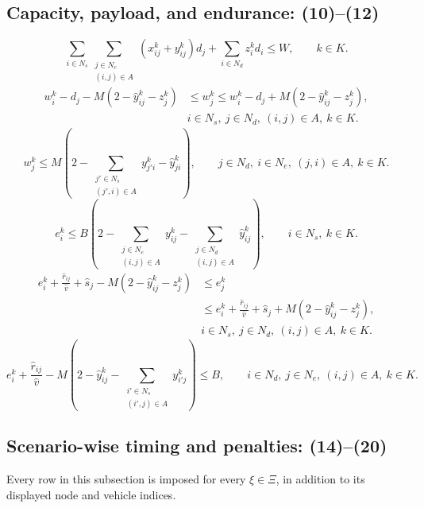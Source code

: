 \documentclass[10pt]{article}
\begin{document}
\subsection*{Capacity, payload, and endurance: (10)--(12)}
\begin{equation}
\sum_{i\in N_s}\sum_{\substack{j\in N_c\\(i,j)\in A}}(x_{ij}^k+y_{ij}^k)d_j+\sum_{i\in N_d}z_i^k d_i\leq W,
\qquad k\in K.\tag{10}
\end{equation}
\begin{equation}
\begin{aligned}
w_i^k-d_j-M(2-\hat y_{ij}^k-z_j^k)
&\leq w_j^k\leq w_i^k-d_j+M(2-\hat y_{ij}^k-z_j^k),\\
&i\in N_s,\ j\in N_d,\ (i,j)\in A,\ k\in K.
\end{aligned}\tag{11a}
\end{equation}
\begin{equation}
w_j^k\leq M\left(2-\sum_{\substack{j'\in N_s\\(j',i)\in A}}y_{j'i}^k-\hat y_{ji}^k\right),
\qquad j\in N_d,\ i\in N_e,\ (j,i)\in A,\ k\in K.\tag{11b}
\end{equation}
\begin{equation}
e_i^k\leq B\left(2-\sum_{\substack{j\in N_e\\(i,j)\in A}}y_{ij}^k-\sum_{\substack{j\in N_d\\(i,j)\in A}}\hat y_{ij}^k\right),
\qquad i\in N_s,\ k\in K.\tag{12a}
\end{equation}
\begin{equation}
\begin{aligned}
e_i^k+\frac{\hat r_{ij}}{\hat v}+\hat s_j-M(2-\hat y_{ij}^k-z_j^k)
&\leq e_j^k\\
&\leq e_i^k+\frac{\hat r_{ij}}{\hat v}+\hat s_j+M(2-\hat y_{ij}^k-z_j^k),\\
&i\in N_s,\ j\in N_d,\ (i,j)\in A,\ k\in K.
\end{aligned}\tag{12b}
\end{equation}
\begin{equation}
e_i^k+\frac{\hat r_{ij}}{\hat v}-M\left(2-\hat y_{ij}^k-\sum_{\substack{i'\in N_s\\(i',j)\in A}}y_{i'j}^k\right)\leq B,
\qquad i\in N_d,\ j\in N_e,\ (i,j)\in A,\ k\in K.\tag{12c}
\end{equation}

\subsection*{Scenario-wise timing and penalties: (14)--(20)}
Every row in this subsection is imposed for every $\xi\in\Xi$, in addition to its displayed node and vehicle indices.
\end{document}
